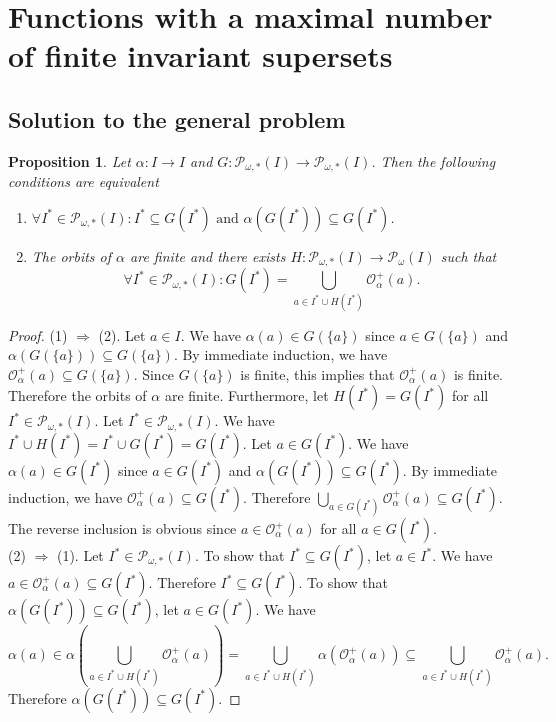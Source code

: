 \documentclass[a4paper,11pt]{article}
\theoremstyle{plain}
\newtheorem{proposition}{Proposition}[section]
\theoremstyle{definition}
\theoremstyle{remark}
\begin{document}
\section{Functions with a maximal number of finite invariant supersets}
\label{sectionExactSuperPreservUnderDirectImage}

\subsection{Solution to the general problem} 

\begin{proposition}
\label{propCharMapPreservingSupersets}
Let $\alpha : I \to I$ and $G : \mathcal{P}_{\omega,*}(I) \to \mathcal{P}_{\omega,*}(I)$. Then the following conditions are equivalent
\begin{enumerate}
\item $\forall I^* \in \mathcal{P}_{\omega,*}(I) : I^* \subseteq G(I^*) \text{ and } \alpha(G(I^*)) \subseteq G(I^*)$. 
\item The orbits of $\alpha$ are finite and there exists $H : \mathcal{P}_{\omega,*}(I) \to \mathcal{P}_{\omega}(I)$ such that 
\[ \forall I^* \in \mathcal{P}_{\omega,*}(I) : G(I^*) = \bigcup_{a \in I^* \cup H(I^*)} \mathcal{O}^{+}_\alpha(a). \]
\end{enumerate}
\end{proposition}

\begin{proof}
(1) $\Rightarrow$ (2). Let $a \in I$. We have $\alpha(a) \in G(\{a\})$ since $a \in G(\{a\})$ and $\alpha(G(\{a\})) \subseteq G(\{a\})$. By immediate induction, we have $\mathcal{O}^{+}_\alpha(a) \subseteq G(\{a\})$. Since $G(\{a\})$ is finite, this implies that $\mathcal{O}^{+}_\alpha(a)$ is finite. Therefore the orbits of $\alpha$ are finite. Furthermore, let $H(I^*) = G(I^*)$ for all $I^* \in \mathcal{P}_{\omega,*}(I)$. Let $I^* \in \mathcal{P}_{\omega,*}(I)$. We have $I^* \cup H(I^*) = I^* \cup G(I^*) = G(I^*)$. Let $a \in G(I^*)$. We have $\alpha(a) \in G(I^*)$ since $a \in G(I^*)$ and $\alpha(G(I^*)) \subseteq G(I^*)$. By immediate induction, we have $\mathcal{O}^{+}_\alpha(a) \subseteq G(I^*)$. Therefore $\bigcup_{a \in G(I^*)} \mathcal{O}^{+}_\alpha(a) \subseteq G(I^*)$. The reverse inclusion is obvious since $a \in \mathcal{O}^{+}_\alpha(a)$ for all $a \in G(I^*)$. \\
(2) $\Rightarrow$ (1). Let $I^* \in \mathcal{P}_{\omega,*}(I)$. To show that $I^* \subseteq G(I^*)$, let $a \in I^*$. We have ${a \in \mathcal{O}^{+}_\alpha(a) \subseteq G(I^*)}$. Therefore $I^* \subseteq G(I^*)$. To show that $\alpha(G(I^*)) \subseteq G(I^*)$, let $a \in G(I^*)$. We have \[
\alpha(a) \in \alpha \left(\bigcup_{a \in I^* \cup H(I^*)} \mathcal{O}^{+}_\alpha(a) \right) = \bigcup_{a \in I^* \cup H(I^*)} \alpha \left( \mathcal{O}^{+}_\alpha(a) \right) \subseteq \bigcup_{a \in I^* \cup H(I^*)} \mathcal{O}^{+}_\alpha(a). \]
Therefore $\alpha(G(I^*)) \subseteq G(I^*)$.
\end{proof}
\end{document}
